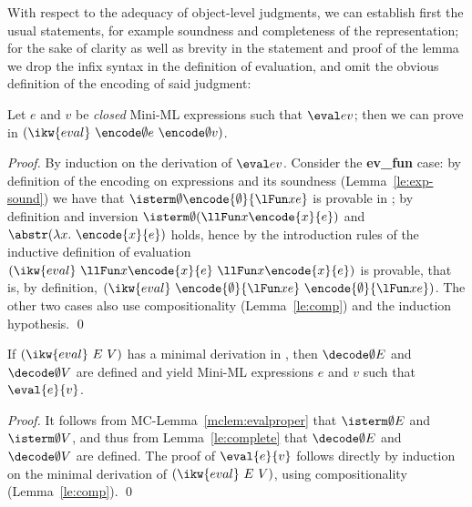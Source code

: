 \documentclass[final]{svjour3}
\begin{document}
With respect to the adequacy of object-level judgments, we can
establish first the usual statements, for example soundness and
completeness of the representation; for the sake of clarity as well as
brevity in the statement and proof of the lemma we drop the infix
syntax in the \HOL definition of evaluation, and omit the obvious
definition of the encoding of said judgment:\newcommand{\eeval}[2]{(\ikw{eval} \ {#1} \ {#2})}
\begin{lem}
  \label{le:adeq-eval}
  Let $e$ and $v$ be \emph{closed} Mini-ML expressions such that $\eval e v$;
  then we can prove in \HOL $\eeval {\encode \emptyset e} {\encode
    \emptyset v}$.
\end{lem}
\begin{proof}
  By induction on the derivation of $\eval e v$. Consider the
  \textbf{ev\_fun} case: by definition of the encoding on expressions
  and its soundness (Lemma~\ref{le:exp-sound}) we have that $\isterm
  \emptyset {\encode{\emptyset}{\lFun x e}}$ is provable in \HOL; by
  definition and inversion $\isterm \emptyset {(\llFun x
    {\encode{x}{e}} )}$ and $\abstr (\lambda x.\ \encode{x}{e})$
  holds, hence by the introduction rules of the inductive definition
  of evaluation $\eeval {\llFun x {\encode{x}{e}}}{\llFun x
    {\encode{x}{e}}}$ is provable, that is, by definition, $\eeval
  {\encode{\emptyset} {\lFun x e}} {\encode{\emptyset} {\lFun x
      e}}$. The other two cases also use compositionality
  (Lemma~\ref{le:comp}) and the induction hypothesis.  \qed\end{proof}

\begin{lem}
  \label{le:complete-eval}
  If $\eeval E V$ has a minimal derivation in \HOL, then
  $\decode\emptyset E$ and $\decode\emptyset V$ are defined and yield
  Mini-ML expressions $e$ and $v$ such that $\eval{e}{v}$.
\end{lem}
\begin{proof}
It follows from MC-Lemma~\ref{mclem:evalproper} that
$\isterm\emptyset{E}$ and $\isterm\emptyset{V}$, and thus from
Lemma~\ref{le:complete} that $\decode\emptyset E$ and
$\decode\emptyset V$ are defined.  The proof of $\eval{e}{v}$ follows
directly by induction on the minimal derivation of $\eeval E V$, using
compositionality (Lemma~\ref{le:comp}).
\qed\end{proof}
\end{document}
